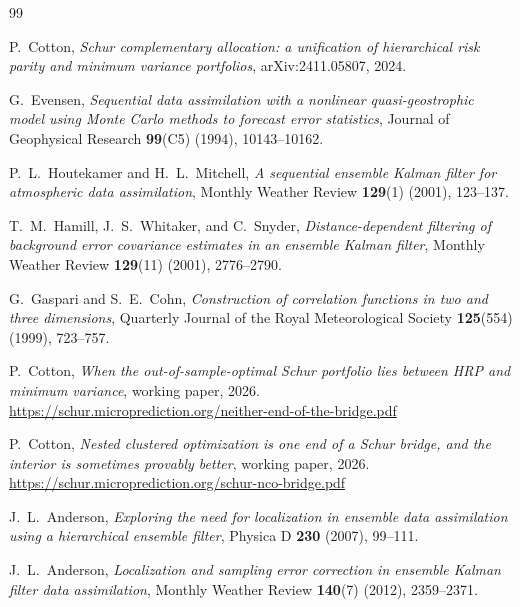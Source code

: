 \documentclass[11pt]{article}
\theoremstyle{remark}
\begin{document}
\begin{thebibliography}{99}

P.~Cotton,
\emph{Schur complementary allocation: a unification of hierarchical risk
parity and minimum variance portfolios},
arXiv:2411.05807, 2024.

G.~Evensen,
\emph{Sequential data assimilation with a nonlinear quasi-geostrophic model
using Monte Carlo methods to forecast error statistics},
Journal of Geophysical Research \textbf{99}(C5) (1994), 10143--10162.

P.~L.~Houtekamer and H.~L.~Mitchell,
\emph{A sequential ensemble Kalman filter for atmospheric data assimilation},
Monthly Weather Review \textbf{129}(1) (2001), 123--137.

T.~M.~Hamill, J.~S.~Whitaker, and C.~Snyder,
\emph{Distance-dependent filtering of background error covariance estimates
in an ensemble Kalman filter},
Monthly Weather Review \textbf{129}(11) (2001), 2776--2790.

G.~Gaspari and S.~E.~Cohn,
\emph{Construction of correlation functions in two and three dimensions},
Quarterly Journal of the Royal Meteorological Society \textbf{125}(554)
(1999), 723--757.

P.~Cotton,
\emph{When the out-of-sample-optimal Schur portfolio lies between HRP and
minimum variance}, working paper, 2026.
\url{https://schur.microprediction.org/neither-end-of-the-bridge.pdf}

P.~Cotton,
\emph{Nested clustered optimization is one end of a Schur bridge, and the
interior is sometimes provably better}, working paper, 2026.
\url{https://schur.microprediction.org/schur-nco-bridge.pdf}

J.~L.~Anderson,
\emph{Exploring the need for localization in ensemble data assimilation
using a hierarchical ensemble filter},
Physica D \textbf{230} (2007), 99--111.

J.~L.~Anderson,
\emph{Localization and sampling error correction in ensemble Kalman filter
data assimilation},
Monthly Weather Review \textbf{140}(7) (2012), 2359--2371.

\end{thebibliography}
\end{document}
